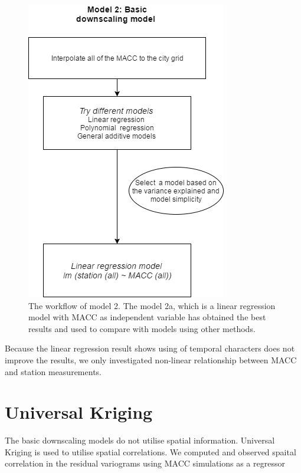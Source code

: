 \documentclass{article}
\begin{document}
\begin{figure}[tbp]
  \center
\includegraphics[scale = 0.4]{diaM2.png}
\caption{The workflow of model 2. The model 2a, which is a linear
  regression model with MACC as independent variable has obtained the
  best results and used to compare with models using other methods. }
\label{fig:LR}
\end{figure}

Because the linear regression result shows using of temporal characters does not improve the results, we only investigated non-linear relationship between MACC and station measurements. 

 

\section{Universal Kriging}

The basic downscaling models do not utilise spatial information. Universal Kriging is used to utilise spatial correlations. We computed and observed spaital correlation in the residual variograms %
using MACC simulations as a regressor
\end{document}
